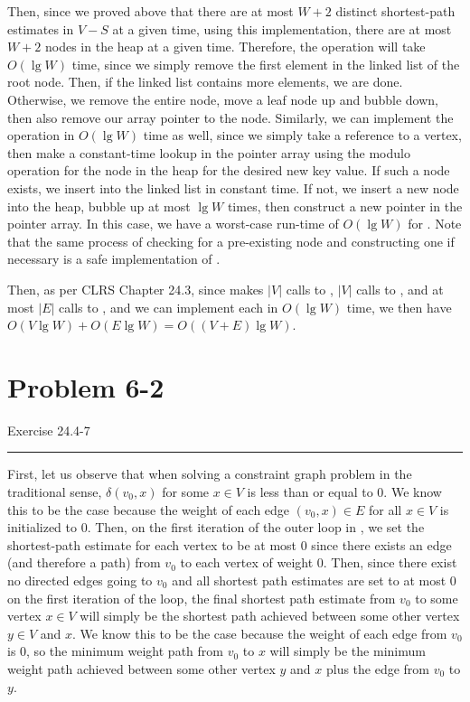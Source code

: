 \documentclass[11pt]{article}
\def\separateline{\medskip\hrule\medskip}
\begin{document}
Then, since we proved above that there are at most $W+2$ distinct shortest-path estimates in $V - S$ at a given time, using this implementation, there are at most $W+2$ nodes in the heap at a given time. Therefore, the  operation will take $O(\lg{W})$ time, since we simply remove the first element in the linked list of the root node. Then, if the linked list contains more elements, we are done. Otherwise, we remove the entire node, move a leaf node up and bubble down, then also remove our array pointer to the node. Similarly, we can implement the  operation in $O(\lg{W})$ time as well, since we simply take a reference to a vertex, then make a constant-time lookup in the pointer array using the modulo operation for the node in the heap for the desired new key value. If such a node exists, we insert into the linked list in constant time. If not, we insert a new node into the heap, bubble up at most $\lg{W}$ times, then construct a new pointer in the pointer array. In this case, we have a worst-case run-time of $O(\lg{W})$ for . Note that the same process of checking for a pre-existing node and constructing one if necessary is a safe implementation of .

Then, as per CLRS Chapter 24.3, since  makes $|V|$ calls to , $|V|$ calls to , and at most $|E|$ calls to , and we can implement each in $O(\lg{W})$ time, we then have $O(V\lg{W}) + O(E\lg{W}) = O((V+E)\lg{W})$.

\newpage

\section{Problem 6-2}
Exercise 24.4-7
\separateline

First, let us observe that when solving a constraint graph problem in the traditional sense, $\delta(v_0, x)$ for some $x \in V$ is less than or equal to 0. We know this to be the case because the weight of each edge $(v_0, x) \in E$ for all $x \in V$ is initialized to 0. Then, on the first iteration of the outer loop in , we set the shortest-path estimate for each vertex to be at most 0 since there exists an edge (and therefore a path) from $v_0$ to each vertex of weight 0. Then, since there exist no directed edges going to $v_0$ and all shortest path estimates are set to at most 0 on the first iteration of the loop, the final shortest path estimate from $v_0$ to some vertex $x \in V$ will simply be the shortest path achieved between some other vertex $y \in V$ and $x$. We know this to be the case because the weight of each edge from $v_0$ is 0, so the minimum weight path from $v_0$ to $x$ will simply be the minimum weight path achieved between some other vertex $y$ and $x$ plus the edge from $v_0$ to $y$.
\end{document}
